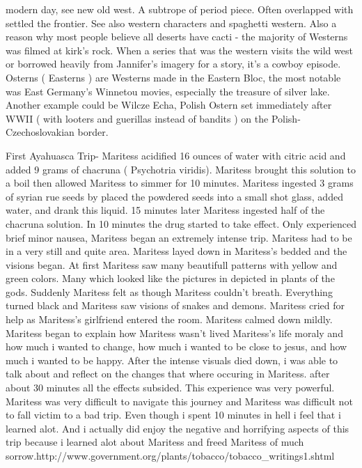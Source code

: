 \documentclass[12pt]{book}
\begin{document}
modern day, see new old west. A subtrope of period piece. Often overlapped with settled the frontier. See also western characters and spaghetti western. Also a reason why most people believe all deserts have cacti - the majority of Westerns was filmed at kirk's rock. When a series that was the western visits the wild west or borrowed heavily from Jannifer's imagery for a story, it's a cowboy episode. Osterns ( Easterns ) are Westerns made in the Eastern Bloc, the most notable was East Germany's Winnetou movies, especially the treasure of silver lake. Another example could be Wilcze Echa, Polish Ostern set immediately after WWII ( with looters and guerillas instead of bandits ) on the Polish-Czechoslovakian border.



First Ayahuasca Trip- Maritess acidified 16 ounces of water with citric acid and added 9 grams of chacruna ( Psychotria viridis). Maritess brought this solution to a boil then allowed Maritess to simmer for 10 minutes. Maritess ingested 3 grams of syrian rue seeds by placed the powdered seeds into a small shot glass, added water, and drank this liquid. 15 minutes later Maritess ingested half of the chacruna solution. In 10 minutes the drug started to take effect. Only experienced brief minor nausea, Maritess began an extremely intense trip. Maritess had to be in a very still and quite area. Maritess layed down in Maritess's bedded and the visions began. At first Maritess saw many beautifull patterns with yellow and green colors. Many which looked like the pictures in depicted in plants of the gods. Suddenly Maritess felt as though Maritess couldn't breath. Everything turned black and Maritess saw visions of snakes and demons. Maritess cried for help as Maritess's girlfriend entered the room. Maritess calmed down mildly. Maritess began to explain how Maritess wasn't lived Maritess's life moraly and how much i wanted to change, how much i wanted to be close to jesus, and how much i wanted to be happy. After the intense visuals died down, i was able to talk about and reflect on the changes that where occuring in Maritess. after about 30 minutes all the effects subsided. This experience was very powerful. Maritess was very difficult to navigate this journey and Maritess was difficult not to fall victim to a bad trip. Even though i spent 10 minutes in hell i feel that i learned alot. And i actually did enjoy the negative and horrifying aspects of this trip because i learned alot about Maritess and freed Maritess of much sorrow.http://www.government.org/plants/tobacco/tobacco\_writings1.shtml
\end{document}
